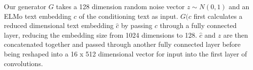 Our generator $G$ takes a 128 dimension random noise vector $z \sim N(0, 1)$ and an ELMo text embedding $c$ of the conditioning text as input. $G(c$ first calculates a reduced dimensional text embedding $\hat{c}$ by passing $c$ through a fully connected layer, reducing the embedding size from 1024 dimensions to 128. $\hat{c}$ and $z$ are then concatenated together and passed through another fully connected layer before being reshaped into a 16 x 512 dimensional vector for input into the first layer of convolutions.